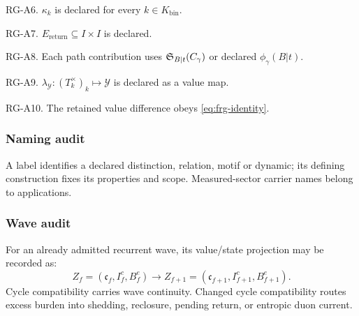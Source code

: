 RG-A6. \(\kappa_k\) is declared for every \(k\in K_{\mathrm{bin}}\).

RG-A7. \(E_{\mathrm{return}}\subseteq I\times I\) is declared.

RG-A8. Each path contribution uses \(\mathfrak S_{B|t}(C_\gamma)\) or declared \(\phi_\gamma(B|t)\).

RG-A9. \(\lambda_{\mathcal Y}:(T_k^\times)_k\mapsto\mathcal Y\) is declared as a value map.

RG-A10. The retained value difference obeys \eqref{eq:frg-identity}.


\subsubsection{Naming audit}\label{subsec:naming-audit}
A label identifies a declared distinction, relation, motif or dynamic;
its defining construction fixes its properties and scope. Measured-sector
carrier names belong to applications.

\subsubsection{Wave audit}\label{subsec:wave-audit}
For an already admitted recurrent wave, its value/state projection may be recorded as:
\[
Z_f=(\mathfrak c_f,I^c_f,B^e_f)
\to
Z_{f+1}=(\mathfrak c_{f+1},I^c_{f+1},B^e_{f+1}).
\]
Cycle compatibility carries wave continuity. Changed cycle compatibility routes excess burden into shedding, reclosure, pending return, or entropic duon current.
